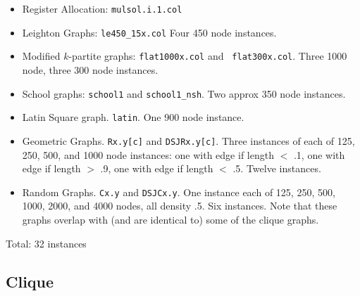 \begin{itemize}
\item Register Allocation: {\tt mulsol.i.1.col}

\item Leighton Graphs: {\tt le450\_15x.col} Four 450 node instances.

\item Modified $k$-partite graphs: {\tt flat1000x.col} and {\tt
    flat300x.col}. Three 1000 node, three 300 node instances.

\item School graphs: {\tt school1} and {\tt school1\_nsh}.  Two approx
  350 node instances.

\item Latin Square graph. {\tt latin}. One 900 node instance.

\item Geometric Graphs.  {\tt Rx.y[c]} and {\tt DSJRx.y[c]}.  Three
  instances of each of 125, 250, 500, and 1000 node instances: one
  with edge if length $<$ .1, one with edge if length $>$ .9, one with
  edge if length $<$ .5.  Twelve instances.

\item Random Graphs.  {\tt Cx.y} and {\tt DSJCx.y}.  One instance each
  of 125, 250, 500, 1000, 2000, and 4000 nodes, all density .5.  Six
  instances.  Note that these graphs overlap with (and are identical
  to) some of the clique graphs.
\end{itemize}

Total: 32 instances

\subsection{Clique}

